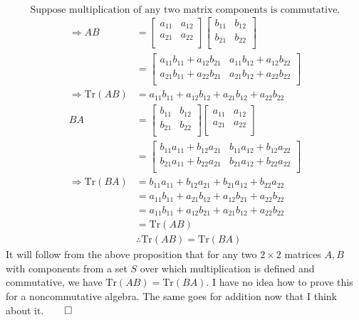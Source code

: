 \documentclass{article}
\begin{document}
\[
    \text{Suppose multiplication of any two matrix components is commutative.}
\]
\begin{align*}
\Longrightarrow AB&=\begin{bmatrix}
    a_{11}  & a_{12}   \\
    a_{21}  &  a_{22}  \\
\end{bmatrix}\begin{bmatrix}
    b_{11}  & b_{12}   \\
     b_{21} &   b_{22} \\
\end{bmatrix}\\
&=\begin{bmatrix}
    a_{11}b_{11}+a_{12}b_{21}     & a_{11}b_{12}+a_{12}b_{22}      \\
    a_{21}b_{11}+a_{22}b_{21}     & a_{21}b_{12}+a_{22}b_{22}      \\
\end{bmatrix}\\
\Longrightarrow \text{Tr}(AB)&=a_{11}b_{11}+a_{12}b_{12}+a_{21}b_{12}+a_{22}b_{22}\\
BA&=\begin{bmatrix}
    b_{11}  & b_{12}   \\
     b_{21} &   b_{22} \\
\end{bmatrix}\begin{bmatrix}
    a_{11}  & a_{12}   \\
    a_{21}  &  a_{22}  \\
\end{bmatrix}\\
&=\begin{bmatrix}
    b_{11}a_{11}+b_{12}a_{21}     & b_{11}a_{12}+b_{12}a_{22}      \\
    b_{21}a_{11}+b_{22}a_{21}     & b_{21}a_{12}+b_{22}a_{22}      \\
\end{bmatrix}\\
\Longrightarrow \text{Tr}(BA)&=b_{11}a_{11}+b_{12}a_{21}+b_{21}a_{12}+b_{22}a_{22}\\
&=a_{11}b_{11}+a_{21}b_{12}+a_{12}b_{21}+a_{22}b_{22}\\
&=a_{11}b_{11}+a_{12}b_{21}+a_{21}b_{12}+a_{22}b_{22}\\
&=\text{Tr}(AB)\\
&\therefore\text{Tr}(AB)=\text{Tr}(BA)
\end{align*}
It will follow from the above proposition that for any two \(2\times 2\) matrices \(A,B\) with components from a set \(S\) over which multiplication is defined and commutative, we have \(\text{Tr}(AB)= \text{Tr}(BA)  \). I have no idea how to prove this for a noncommutative algebra. The same goes for addition now that I think about it.\hfill$\qed$
\end{document}

